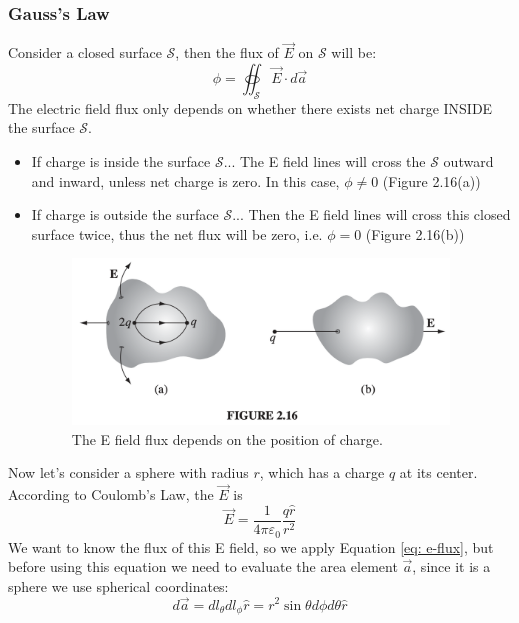 \documentclass[12pt,a4paper,twoside]{article}
\numberwithin{equation}{section}
\begin{document}
\subsubsection{Gauss's Law}
    Consider a closed surface $\mathcal{S}$, then the flux of $\overrightarrow{E}$ on $\mathcal{S}$ will be:
    \begin{equation}
        \phi = \oiint_{\mathcal{S}}\overrightarrow{E}\cdot d\overrightarrow{a}
        \label{eq: e-flux}
    \end{equation}
    The electric field flux only depends on whether there exists net charge INSIDE the surface $\mathcal{S}$.
    \begin{itemize}
        \item If charge is inside the surface $\mathcal{S}$...
            \subitem The E field lines will cross the $\mathcal{S}$ outward and inward, unless net charge is zero. In this case, $\phi\neq 0$ (Figure 2.16(a))
        \item If charge is outside the surface $\mathcal{S}$...
            \subitem Then the E field lines will cross this closed surface twice, thus the net flux will be zero, i.e. $\phi=0$ (Figure 2.16(b))
        \begin{figure}[ht]
            \centering
            \includegraphics[width=10cm]{250-Revision/Fig-2-16.png}
            \caption{The E field flux depends on the position of charge.}
            \label{fig:2-16}
        \end{figure}
    \end{itemize}
    
    Now let's consider a sphere with radius $r$, which has a charge $q$ at its center. According to Coulomb's Law, the $\overrightarrow{E}$ is
    \[\overrightarrow{E} = \frac{1}{4\pi\varepsilon_0}\frac{q\hat{r}}{r^2}\]
    We want to know the flux of this E field, so we apply Equation \ref{eq: e-flux}, but before using this equation we need to evaluate the area element $\overrightarrow{a}$, since it is a sphere we use spherical coordinates:
    \[d\overrightarrow{a}=dl_\theta dl_\phi\hat{r}=r^2\sin\theta d\phi d\theta\hat{r}\]
    
\end{document}
